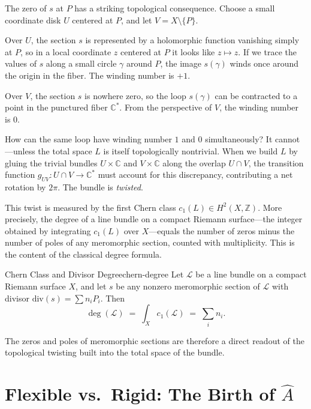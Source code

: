 \documentclass{article}
\newcommand{\C}{{\mathbb{C}}}
\newcommand{\Z}{{\mathbb{Z}}}
\newcommand{\CL}{{\mathcal{L}}}
\begin{document}
The zero of $s$ at $P$ has a striking topological consequence. Choose a small coordinate disk $U$ centered at $P$, and let $V = X \setminus \{P\}$.

Over $U$, the section $s$ is represented by a holomorphic function vanishing simply at $P$, so in a local coordinate $z$ centered at $P$ it looks like $z \mapsto z$. If we trace the values of $s$ along a small circle $\gamma$ around $P$, the image $s(\gamma)$ winds once around the origin in the fiber. The winding number is $+1$.

Over $V$, the section $s$ is nowhere zero, so the loop $s(\gamma)$ can be contracted to a point in the punctured fiber $\C^*$. From the perspective of $V$, the winding number is $0$.

How can the same loop have winding number $1$ and $0$ simultaneously? It cannot---unless the total space $L$ is itself topologically nontrivial. When we build $L$ by gluing the trivial bundles $U \times \C$ and $V \times \C$ along the overlap $U \cap V$, the transition function $g_{UV}\colon U \cap V \to \C^*$ must account for this discrepancy, contributing a net rotation by $2\pi$. The bundle is \emph{twisted}.

This twist is measured by the first Chern class $c_1(L) \in H^2(X, \Z)$. More precisely, the degree of a line bundle on a compact Riemann surface---the integer obtained by integrating $c_1(L)$ over $X$---equals the number of zeros minus the number of poles of any meromorphic section, counted with multiplicity. This is the content of the classical degree formula.

\begin{prop}{Chern Class and Divisor Degree}{chern-degree}
Let $\CL$ be a line bundle on a compact Riemann surface $X$, and let $s$ be any nonzero meromorphic section of $\CL$ with divisor $\mathrm{div}(s) = \sum n_i P_i$. Then
\[
    \deg(\CL) \;=\; \int_X c_1(\CL) \;=\; \sum_i n_i.
\]
\end{prop}

The zeros and poles of meromorphic sections are therefore a direct readout of the topological twisting built into the total space of the bundle.


\section{Flexible vs.\ Rigid: The Birth of $\hat{A}$}
\end{document}
